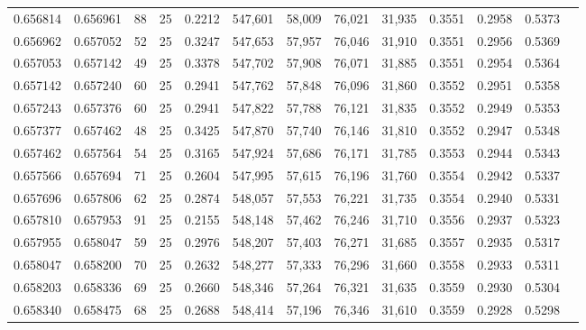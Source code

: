 \begin{tabular}{rrrrrrrrrrrrr}
0.656814 & 0.656961 &    88 &  25 &                                     0.2212 & 547,601 &  58,009 &  76,021 &  31,935 & 0.3551 & 0.2958 & 0.5373 \\
0.656962 & 0.657052 &    52 &  25 &                                     0.3247 & 547,653 &  57,957 &  76,046 &  31,910 & 0.3551 & 0.2956 & 0.5369 \\
0.657053 & 0.657142 &    49 &  25 &                                     0.3378 & 547,702 &  57,908 &  76,071 &  31,885 & 0.3551 & 0.2954 & 0.5364 \\
0.657142 & 0.657240 &    60 &  25 &                                     0.2941 & 547,762 &  57,848 &  76,096 &  31,860 & 0.3552 & 0.2951 & 0.5358 \\
0.657243 & 0.657376 &    60 &  25 &                                     0.2941 & 547,822 &  57,788 &  76,121 &  31,835 & 0.3552 & 0.2949 & 0.5353 \\
0.657377 & 0.657462 &    48 &  25 &                                     0.3425 & 547,870 &  57,740 &  76,146 &  31,810 & 0.3552 & 0.2947 & 0.5348 \\
0.657462 & 0.657564 &    54 &  25 &                                     0.3165 & 547,924 &  57,686 &  76,171 &  31,785 & 0.3553 & 0.2944 & 0.5343 \\
0.657566 & 0.657694 &    71 &  25 &                                     0.2604 & 547,995 &  57,615 &  76,196 &  31,760 & 0.3554 & 0.2942 & 0.5337 \\
0.657696 & 0.657806 &    62 &  25 &                                     0.2874 & 548,057 &  57,553 &  76,221 &  31,735 & 0.3554 & 0.2940 & 0.5331 \\
0.657810 & 0.657953 &    91 &  25 &                                     0.2155 & 548,148 &  57,462 &  76,246 &  31,710 & 0.3556 & 0.2937 & 0.5323 \\
0.657955 & 0.658047 &    59 &  25 &                                     0.2976 & 548,207 &  57,403 &  76,271 &  31,685 & 0.3557 & 0.2935 & 0.5317 \\
0.658047 & 0.658200 &    70 &  25 &                                     0.2632 & 548,277 &  57,333 &  76,296 &  31,660 & 0.3558 & 0.2933 & 0.5311 \\
0.658203 & 0.658336 &    69 &  25 &                                     0.2660 & 548,346 &  57,264 &  76,321 &  31,635 & 0.3559 & 0.2930 & 0.5304 \\
0.658340 & 0.658475 &    68 &  25 &                                     0.2688 & 548,414 &  57,196 &  76,346 &  31,610 & 0.3559 & 0.2928 & 0.5298 \\

\end{tabular}
